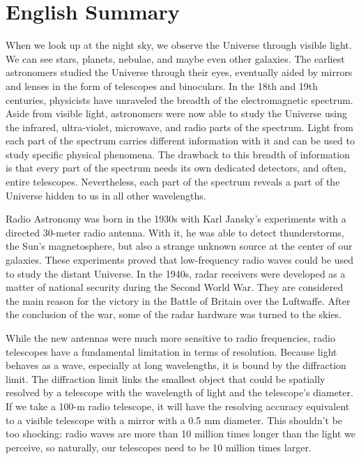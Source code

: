 \cleardoublepage
{}
 

\chapter*{English Summary}\label{ch:summary_eng}
When we look up at the night sky, we observe the Universe through visible light. We can see stars, planets, nebulae, and maybe even other galaxies. The earliest astronomers studied the Universe through their eyes, eventually aided by mirrors and lenses in the form of telescopes and binoculars. In the 18th and 19th centuries, physicists have unraveled the breadth of the electromagnetic spectrum. Aside from visible light, astronomers were now able to study the Universe using the infrared, ultra-violet, microwave, and radio parts of the spectrum. Light from each part of the spectrum carries different information with it and can be used to study specific physical phenomena. The drawback to this breadth of information is that every part of the spectrum needs its own dedicated detectors, and often, entire telescopes. Nevertheless, each part of the spectrum reveals a part of the Universe hidden to us in all other wavelengths.

Radio Astronomy was born in the 1930s with Karl Jansky's experiments with a directed 30-meter radio antenna. With it, he was able to detect thunderstorms, the Sun's magnetosphere, but also a strange unknown source at the center of our galaxies. These experiments proved that low-frequency radio waves could be used to study the distant Universe. In the 1940s, radar receivers were developed as a matter of national security during the Second World War. They are considered the main reason for the victory in the Battle of Britain over the Luftwaffe. After the conclusion of the war, some of the radar hardware was turned to the skies. 

While the new antennas were much more sensitive to radio frequencies, radio telescopes have a fundamental limitation in terms of resolution. Because light behaves as a wave, especially at long wavelengths, it is bound by the diffraction limit. The diffraction limit links the smallest object that could be spatially resolved by a telescope with the wavelength of light and the telescope's diameter. If we take a 100-m radio telescope, it will have the resolving accuracy equivalent to a visible telescope with a mirror with a 0.5 mm diameter. This shouldn't be too shocking: radio waves are more than 10 million times longer than the light we perceive, so naturally, our telescopes need to be 10 million times larger.                                                                      

